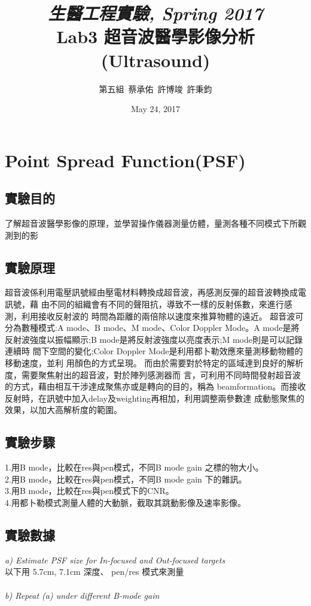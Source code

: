 \documentclass[12pts,a4paper]{article}
\title{\emph{生醫工程實驗, Spring 2017}\\ Lab3 超音波醫學影像分析(Ultrasound)}
\author{第五組\ 蔡承佑\ 許博竣\ 許秉鈞}
\date{May 24, 2017} %
\begin{document}
\maketitle


\section{Point Spread Function(PSF)}
\subsection{實驗目的}
了解超音波醫學影像的原理，並學習操作儀器測量仿體，量測各種不同模式下所觀測到的影
\subsection{實驗原理}
 超音波係利用電壓訊號經由壓電材料轉換成超音波，再感測反彈的超音波轉換成電訊號，藉 由不同的組織會有不同的聲阻抗，導致不一樣的反射係數，來進行感測，利用接收反射波的 時間為距離的兩倍除以速度來推算物體的遠近。
超音波可分為數種模式:A mode、B mode、M mode、Color Doppler Mode。A mode是將 反射波強度以振幅顯示;B mode是將反射波強度以亮度表示;M mode則是可以記錄連續時 間下空間的變化;Color Doppler Mode是利用都卜勒效應來量測移動物體的移動速度，並利 用顏色的方式呈現。 而由於需要對於特定的區域達到良好的解析度，需要聚焦射出的超音波，對於陣列感測器而 言，可利用不同時間發射超音波的方式，藉由相互干涉達成聚焦亦或是轉向的目的，稱為 beamformation。而接收反射時，在訊號中加入delay及weighting再相加，利用調整兩參數達 成動態聚焦的效果，以加大高解析度的範圍。
\subsection{實驗步驟}
1.用B mode，比較在res與pen模式，不同B mode gain 之標的物大小。\\
2.用B mode，比較在res與pen模式，不同B mode gain 下的雜訊。\\
3.用B mode，比較在res與pen模式下的CNR。\\ 4.用都卜勒模式測量人體的大動脈，截取其跳動影像及速率影像。

\subsection{實驗數據}
\emph{a) Estimate PSF size for In-focused and Out-focused targets}  \\
以下用 5.7cm, 7.1cm 深度、 pen/res 模式來測量\\
\\
\emph{b) Repeat (a) under different B-mode gain} \\
\end{document}
